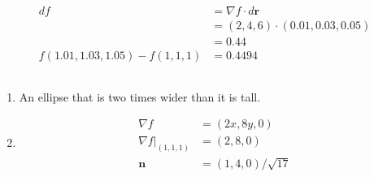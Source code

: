 \documentclass{article}
\renewcommand{\vec}[1]{\boldsymbol{\mathbf{#1}}}
\begin{document}
\begin{align*}
  d f                              & = \nabla f \cdot d \vec{r}           \\
                                   & = (2, 4, 6) \cdot (0.01, 0.03, 0.05) \\
                                   & = 0.44                               \\
  f(1.01, 1.03, 1.05) - f(1, 1, 1) & = 0.4494
\end{align*}

\setcounter{subsection}{18}
\subsection{}

\begin{enumerate}
  \item An ellipse that is two times wider than it is tall.

  \item

        \begin{align*}
          \nabla f                            & = (2 x, 8 y, 0)         \\
          \left. \nabla f \right|_{(1, 1, 1)} & = (2, 8, 0)             \\
          \vec{n}                             & = (1, 4, 0) / \sqrt{17}
        \end{align*}
\end{enumerate}

\setcounter{subsection}{20}
\subsection{}
\end{document}
